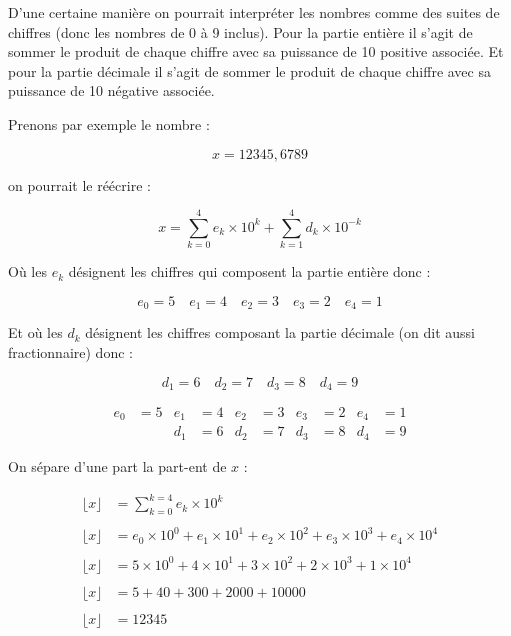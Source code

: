 \documentclass[a4paper,11pt]{book}
\begin{document}
D'une certaine manière on pourrait interpréter les nombres comme
des suites de chiffres (donc les nombres de 0 à 9 inclus). Pour la
partie entière il s'agit de sommer le produit de chaque chiffre
avec sa puissance de 10 positive associée. Et pour la partie
décimale il s'agit de sommer le produit de chaque
chiffre avec sa puissance de 10 négative associée.

Prenons par exemple le nombre :

\[x = 12345,6789\]

on pourrait le réécrire :

\[x = \sum_{k = 0}^4e_k\times 10^k + \sum_{k = 1}^4d_k\times 10^{-k}\]

Où les \(e_k\) désignent les chiffres qui composent la partie
entière donc :

\[e_0 = 5\quad e_1 = 4\quad e_2 = 3\quad e_3 = 2\quad e_4 = 1\]

Et où les \(d_k\) désignent les chiffres composant la partie
décimale (on dit aussi fractionnaire) donc :

\[d_1 = 6\quad d_2 = 7\quad d_3 = 8\quad d_4 = 9\]

\newpage

\begin{align*}
e_0 &= 5& e_1 &= 4& e_2 &= 3& e_3 &= 2& e_4 &= 1\\
&& d_1 &= 6&  d_2 &= 7&  d_3 &= 8&  d_4 &= 9
\end{align*}




\newpage

On sépare d'une part la \gls{part-ent} de
\(x\) :

\begin{align*}
\lfloor x \rfloor &= \sum_{k = 0}^{k = 4}e_k\times 10^k\\ \\
\lfloor x \rfloor &= e_0\times 10^0 + e_1\times 10^1 + e_2\times 10^2 + e_3\times 10^3 +
    e_4\times 10^4\\ \\
\lfloor x \rfloor &= 5\times 10^0 + 4\times 10^1 + 3\times 10^2 + 2\times 10^3 +
    1\times 10^4\\ \\
\lfloor x \rfloor &= 5 + 40 + 300 + 2000 + 10000\\ \\
\lfloor x \rfloor &= 12345
\end{align*}

\newpage
\end{document}
